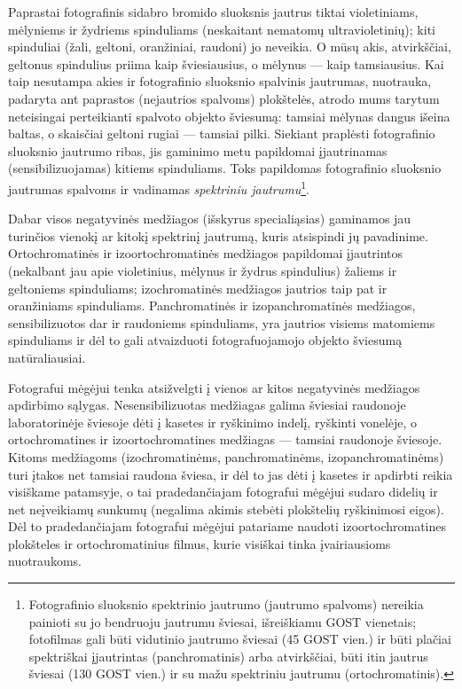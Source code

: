 \documentclass[12pt]{book}
\begin{document}
					Paprastai fotografinis sidabro bromido sluoksnis jautrus tiktai violetiniams, mėlyniems ir žydriems spinduliams (neskaitant nematomų ultravioletinių); kiti spinduliai (žali, geltoni, oranžiniai, raudoni) jo neveikia. O mūsų akis, atvirkščiai, geltonus spindulius priima kaip šviesiausius, o mėlynus --- kaip tamsiausius. Kai taip nesutampa akies ir fotografinio sluoksnio spalvinis jautrumas, nuotrauka, padaryta ant paprastos (nejautrios spalvoms) plokštelės, atrodo mums tarytum neteisingai perteikianti spalvoto objekto šviesumą: tamsiai mėlynas dangus išeina baltas, o skaisčiai geltoni rugiai --- tamsiai pilki. Siekiant praplėsti fotografinio sluoksnio jautrumo ribas, jis gaminimo metu papildomai įjautrinamas (sensibilizuojamas) kitiems spinduliams. Toks papildomas fotografinio sluoksnio jautrumas spalvoms ir vadinamas \textit{spektriniu jautrumu}\footnote{Fotografinio sluoksnio spektrinio jautrumo (jautrumo spalvoms) nereikia painioti su jo bendruoju jautrumu šviesai, išreiškiamu GOST vienetais; fotofilmas gali būti vidutinio jautrumo šviesai (45 GOST vien.) ir būti plačiai spektriškai įjautrintas (panchromatinis) arba atvirkščiai, būti itin jautrus šviesai (130 GOST vien.) ir su mažu spektriniu jautrumu (ortochromatinis).}.

					Dabar visos negatyvinės medžiagos (išskyrus specialiąsias) gaminamos jau turinčios vienokį ar kitokį spektrinį jautrumą, kuris atsispindi jų pavadinime. Ortochromatinės ir izoortochromatinės medžiagos papildomai įjautrintos (nekalbant jau apie violetinius, mėlynus ir žydrus spindulius) žaliems ir geltoniems spinduliams; izochromatinės medžiagos jautrios taip pat ir oranžiniams spinduliams. Panchromatinės ir izopanchromatinės medžiagos, sensibilizuotos dar ir raudoniems spinduliams, yra jautrios visiems matomiems spinduliams ir dėl to gali atvaizduoti fotografuojamojo objekto šviesumą natūraliausiai.

					Fotografui mėgėjui tenka atsižvelgti į vienos ar kitos negatyvinės medžiagos apdirbimo sąlygas. Nesensibilizuotas medžiagas galima šviesiai raudonoje laboratorinėje šviesoje dėti į kasetes ir ryškinimo indelį, ryškinti vonelėje, o ortochromatines ir izoortochromatines medžiagas --- tamsiai raudonoje šviesoje. Kitoms medžiagoms (izochromatinėms, panchromatinėms, izopanchromatinėms) turi įtakos net tamsiai raudona šviesa, ir dėl to jas dėti į kasetes ir apdirbti reikia visiškame patamsyje, o tai pradedančiajam fotografui mėgėjui sudaro didelių ir net neįveikiamų sunkumų (negalima akimis stebėti plokštelių ryškinimosi eigos). Dėl to pradedančiajam fotografui mėgėjui patariame naudoti izoortochromatines plokšteles ir ortochromatinius filmus, kurie visiškai tinka įvairiausioms nuotraukoms.
\end{document}
